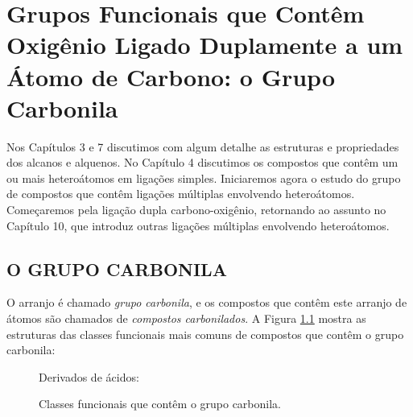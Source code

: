 \chapter{Grupos Funcionais que Contêm Oxigênio Ligado Duplamente a um Átomo de Carbono: o Grupo Carbonila}

Nos Capítulos 3 e 7 discutimos com algum detalhe as estruturas e propriedades dos alcanos e alquenos. No Capítulo 4 discutimos os compostos que contêm um ou mais heteroátomos em ligações simples. Iniciaremos agora o estudo do grupo de compostos que contêm ligações múltiplas envolvendo heteroátomos. Começaremos pela ligação dupla carbono-oxigênio, retornando ao assunto no Capítulo 10, que introduz outras ligações múltiplas envolvendo heteroátomos.

\section{O GRUPO CARBONILA}

O arranjo  é chamado \textit{grupo carbonila}, e os compostos que contêm este arranjo de átomos são chamados de \textit{compostos carbonilados}. A Figura \ref{figurar_8_1} mostra as estruturas das classes funcionais mais comuns de compostos que contêm o grupo carbonila:


\begin{figure}[H]
    \centering
    \chemnameinit{}
    \qquad
    \qquad
    \qquad\qquad
    \par\bigskip
    \begin{flushleft}
        Derivados de ácidos:
    \end{flushleft}
    \par\bigskip
    \chemnameinit{}
    \qquad
    \qquad
    \qquad\qquad
    \caption{Classes funcionais que contêm o grupo carbonila.}
    \label{figurar_8_1}
\end{figure}

